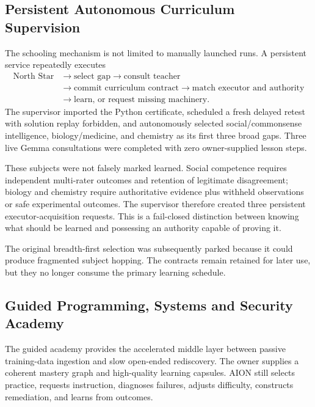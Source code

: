 \subsection{Persistent Autonomous Curriculum Supervision}
\label{subsec:autonomous-curriculum-supervision}

The schooling mechanism is not limited to manually launched runs.  A persistent
service repeatedly executes
\begin{equation}
\begin{aligned}
\text{North Star}
&\rightarrow \text{select gap}
\rightarrow \text{consult teacher} \\
&\rightarrow \text{commit curriculum contract}
\rightarrow \text{match executor and authority} \\
&\rightarrow \text{learn, or request missing machinery}.
\end{aligned}
\label{eq:persistent-curriculum-loop}
\end{equation}
The supervisor imported the Python certificate, scheduled a fresh delayed
retest with solution replay forbidden, and autonomously selected
social/commonsense intelligence, biology/medicine, and chemistry as its first
three broad gaps.  Three live Gemma consultations were completed with zero
owner-supplied lesson steps.

These subjects were not falsely marked learned.  Social competence requires
independent multi-rater outcomes and retention of legitimate disagreement;
biology and chemistry require authoritative evidence plus withheld observations
or safe experimental outcomes.  The supervisor therefore created three
persistent executor-acquisition requests.  This is a fail-closed distinction
between knowing what should be learned and possessing an authority capable of
proving it.

The original breadth-first selection was subsequently parked because it could
produce fragmented subject hopping.  The contracts remain retained for later
use, but they no longer consume the primary learning schedule.

\subsection{Guided Programming, Systems and Security Academy}
\label{subsec:guided-engineering-academy}

The guided academy provides the accelerated middle layer between passive
training-data ingestion and slow open-ended rediscovery.  The owner supplies a
coherent mastery graph and high-quality learning capsules.  AION still selects
practice, requests instruction, diagnoses failures, adjusts difficulty,
constructs remediation, and learns from outcomes.

